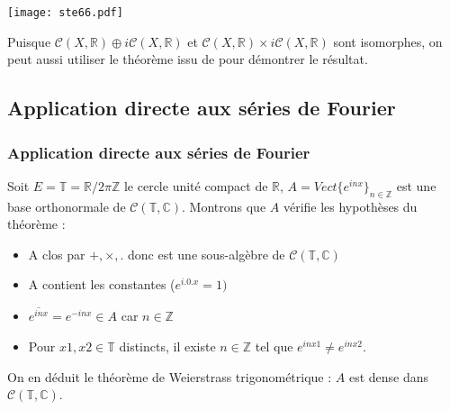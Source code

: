 \documentclass[
	10pt, %
	xcolor={svgnames}
]{beamer}
\begin{document}

\begin{frame}

	\center\texttt{[image: ste66.pdf]}

	\par Puisque \( \mathcal{C}(X,\mathbb{R}) \oplus i\mathcal{C}(X,\mathbb{R}) \) et \( \mathcal{C}(X,\mathbb{R}) \times i\mathcal{C}(X,\mathbb{R}) \) sont isomorphes, on peut aussi utiliser le théorème issu de \cite{stephenson1968spaces} pour démontrer le résultat. 
	\nocite{nlab:direct_sum_of_banach_spaces}
	\nocite{nlab:stone-weierstrass_theorem}
\end{frame}



\begin{frame}
\subsection{Application directe aux séries de Fourier}
\frametitle{Application directe aux séries de Fourier}

\par Soit \( E = \mathbb{T} = \mathbb{R}/2\pi\mathbb{Z} \) le cercle unité compact de \( \mathbb{R} \), \(A = Vect\{e^{inx}\}_{n \in \mathbb{Z}}\) est une base orthonormale de \( \mathcal{C}(\mathbb{T},\mathbb{C}) \). Montrons que \( A \) vérifie les hypothèses du théorème :
\begin{itemize}
	\item A clos par \( +,\times,. \) donc est une sous-algèbre de \( \mathcal{C}(\mathbb{T},\mathbb{C}) \)
	\item A contient les constantes (\( e^{i.0.x} = 1) \)
	\item \( \overline{e^{inx}} = e^{-inx} \in A \) car \( n \in \mathbb{Z} \)
	\item Pour \( x1, x2 \in \mathbb{T} \) distincts, il existe \( n \in \mathbb{Z} \) tel que 
		\( e^{inx1} \neq e^{inx2} \).
\end{itemize}

On en déduit le théorème de Weierstrass trigonométrique : \( A \) est dense dans \( \mathcal{C}(\mathbb{T},\mathbb{C}) \).

\end{frame}
\end{document}
